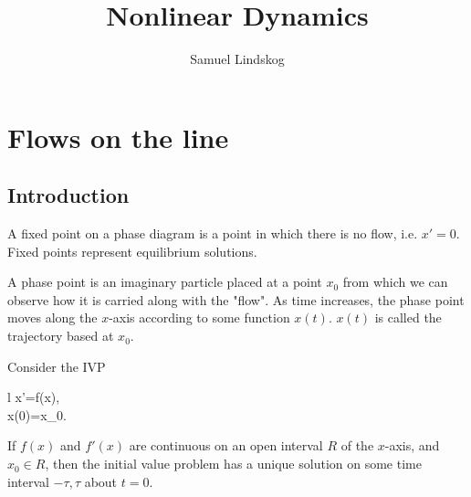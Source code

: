 \documentclass{article}
\title{Nonlinear Dynamics}
\author{Samuel Lindskog}
\begin{document}
\maketitle
{}
\tableofcontents
{}
\clearpage
{}
\setcounter{page}{1}

\section{Flows on the line}
\subsection{Introduction}
\begin{definition}
	A fixed point on a phase diagram is a point in which there is no flow, i.e. \(x'=0\). Fixed points represent equilibrium solutions.
\end{definition}
\begin{definition}
	A phase point is an imaginary particle placed at a point \(x_0\) from which we can observe how it is carried along with the "flow". As time increases, the phase point moves along the \(x\)-axis according to some function \(x(t)\). \(x(t)\) is called the trajectory based at \(x_0\).
\end{definition}
\begin{theorem}
	Consider the IVP
	\begin{IEEEeqnarray*}{l}
		x'=f(x),\\
		x(0)=x_0.
	\end{IEEEeqnarray*}
	If \(f(x)\) and \(f'(x)\) are continuous on an open interval \(R\) of the \(x\)-axis, and \(x_0\in R\), then the initial value problem has a unique solution on some time interval \(-\tau,\tau\) about \(t=0\).
\end{theorem}
\end{document}
